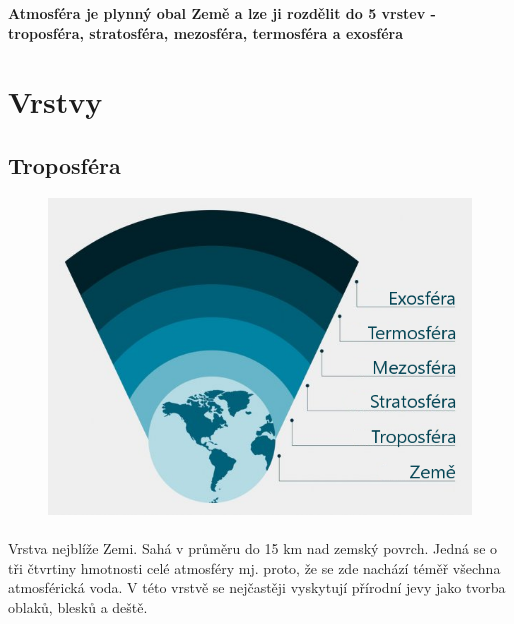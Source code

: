 \documentclass[11pt]{article}
\title{\vspace{-2cm}{\Huge \textbf{Atmosféra}}}
\author{Pracovní list č. 1}
\date{Českolipská vesmírná agentura}
\begin{document}

\maketitle

\begin{center}
\begin{large}

\textbf{Atmosféra je plynný obal Země a lze ji rozdělit do 5 vrstev - 
\newline troposféra, stratosféra, mezosféra, termosféra a exosféra}

\end{large}
\end{center}

\section{Vrstvy}
%
\subsection*{Troposféra}
%
\begin{figure}
 \centering
 \vspace{-2em}
 \includegraphics[width=\linewidth]{resources/unknown.png}
\end{figure}
\paragraph{}
Vrstva nejblíže Zemi. Sahá v průměru do 15 km nad zemský povrch. Jedná se o tři čtvrtiny hmotnosti celé atmosféry mj. proto, že se zde nachází téměř všechna atmosférická voda. V této vrstvě se nejčastěji vyskytují přírodní jevy jako tvorba oblaků, blesků a deště.
\end{document}
